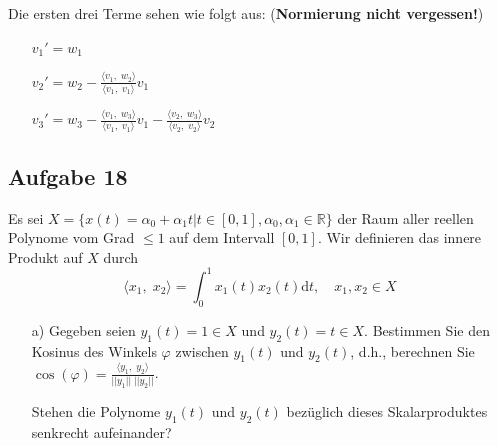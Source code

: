 \documentclass[11pt]{article}
\begin{document}

Die ersten drei Terme sehen wie folgt aus: (\textbf{Normierung nicht vergessen!})
\begin{multicols}{3}
    \begin{itemize}[leftmargin = 0pt]
        \item[] $v_1' = w_1$
        \item[] $v_2' = w_2 - \frac{\langle v_1, \; w_2 \rangle}{\langle v_1, \; v_1 \rangle} v_1$
        \item[] $v_3' = w_3 - \frac{\langle v_1, \; w_3 \rangle}{\langle v_1, \; v_1 \rangle} v_1 - \frac{\langle v_2, \; w_3 \rangle}{\langle v_2, \; v_2 \rangle} v_2$
    \end{itemize}
\end{multicols}

\vspace*{-0.5cm}
\subsection*{Aufgabe 18}
\vspace*{-0.5cm}
Es sei $X = \{x(t)=\alpha_0 + \alpha_1 t | t \in [0,1], \alpha_0,\alpha_1 \in \mathbb{R}\}$ der Raum aller reellen Polynome vom Grad $\leq 1$ auf dem Intervall $[0,1]$. Wir definieren das innere Produkt auf $X$ durch 
$$\langle x_1, \; x_2 \rangle = \displaystyle\int_0^1 x_1(t)x_2(t)\text{d}t, \hspace{12pt} x_1, x_2 \in X$$

\begin{itemize}
    \item[a)] Gegeben seien $y_1(t) = 1 \in X$ und $y_2(t) = t \in X$. Bestimmen Sie den Kosinus des Winkels $\varphi$ zwischen $y_1(t)$ und $y_2(t)$, d.h., berechnen Sie $\cos (\varphi) = \frac{\langle y_1, \; y_2 \rangle}{||y_1|| \; ||y_2||}$.
    \item[] Stehen die Polynome $y_1(t)$ und $y_2(t)$ bezüglich dieses Skalarproduktes senkrecht aufeinander?
\end{itemize}
\end{document}
